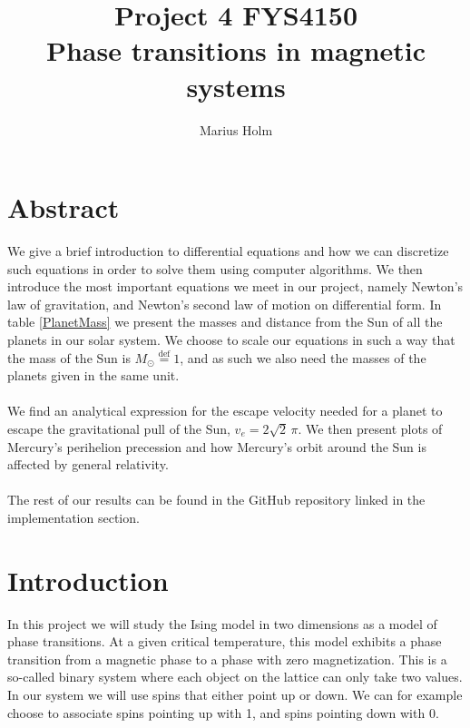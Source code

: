 \documentclass[a4paper, fontsize=11pt]{article}
\begin{document}
\title{Project 4 FYS4150 \\ Phase transitions in magnetic systems}
\author{Marius Holm}

\maketitle


\section{Abstract}
We give a brief introduction to differential equations and how we can discretize such equations in order to solve them using computer algorithms. We then introduce the most important equations we meet in our project, namely Newton's law of gravitation, and Newton's second law of motion on differential form. In table \ref{PlanetMass} we present the masses and distance from the Sun of all the planets in our solar system. We choose to scale our equations in such a way that the mass of the Sun is $M_{\odot}\overset{\text{def}}{=} 1$, and as such we also need the masses of the planets given in the same unit.


\paragraph{}
We find an analytical expression for the escape velocity needed for a planet to escape the gravitational pull of the Sun, $v_{e} = 2\sqrt{2} \, \pi$. We then present plots of Mercury's perihelion precession and how Mercury's orbit around the Sun is affected by general relativity.


\paragraph{}
The rest of our results can be found in the GitHub repository linked in the implementation section. 

\section{Introduction}
In this project we will study the Ising model in two dimensions as a model of phase transitions. At a given critical temperature, this model exhibits a phase transition from a magnetic phase to a phase with zero magnetization. This is a so-called binary system where each object on the lattice can only take two values. In our system we will use spins that either point up or down. We can for example choose to associate spins pointing up with 1, and spins pointing down with 0. 
\end{document}

